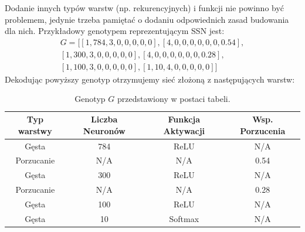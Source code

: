 \documentclass{article}
\begin{document}
Dodanie innych typów warstw (np. rekurencyjnych) i funkcji nie powinno być problemem, jedynie
trzeba pamiętać o dodaniu odpowiednich zasad budowania dla nich.
Przykładowy genotypem reprezentującym SSN jest:\\
\begin{align*}
	  G = \big[[1, 784, 3, 0, 0, 0, 0, 0], [4, 0, 0, 0, 0, 0, 0, 0.54],\\
	          [1, 300, 3, 0, 0, 0, 0, 0], [4, 0, 0, 0, 0, 0, 0, 0.28],\\ 
	          [1, 100, 3, 0, 0, 0, 0, 0], [1, 10, 4, 0, 0, 0, 0, 0]\big]
\end{align*}
Dekodując powyższy genotyp otrzymujemy sieć złożoną z następujących warstw:\\
\begin{table}[!h]
\centering
\begin{tabular}{|c|c|c|c|}
	\hline
	Typ warstwy & Liczba Neuronów & Funkcja Aktywacji & Wsp. Porzucenia \\
	\hline
	Gęsta & 784 & ReLU & N/A \\
	Porzucanie & N/A & N/A & 0.54\\
	Gęsta & 300 & ReLU & N/A \\
	Porzucanie & N/A & N/A & 0.28\\
	Gęsta & 100 & ReLU & N/A \\
	Gęsta & 10 & Softmax & N/A \\
	\hline
\end{tabular}
\caption{\label{tab:gen1}Genotyp $G$ przedstawiony w postaci tabeli.}
\end{table}
\end{document}
